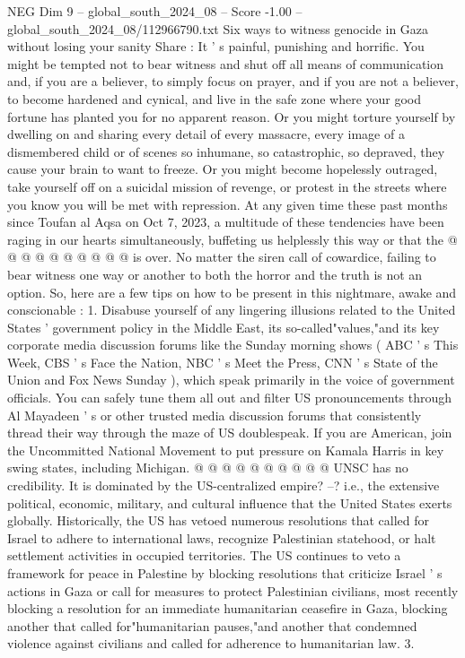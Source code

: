 \begin{textsample}{NEG Dim 9 – global\_south\_2024\_08 – Score -1.00 – global\_south\_2024\_08/112966790.txt}  \label{ex:f9_neg_341}
Six ways to witness genocide in Gaza without losing your sanity Share : It ' s painful, punishing and horrific.
You might be tempted not to bear witness and shut off all means of communication and, if you are a believer, to simply focus on prayer, and if you are not a believer, to become hardened and cynical, and live in the safe zone where your good fortune has planted you for no apparent reason.
Or you might torture yourself by dwelling on and sharing every detail of every massacre, every image of a dismembered child or of scenes so inhumane, so catastrophic, so depraved, they cause your brain to want to freeze.
Or you might become hopelessly outraged, take yourself off on a suicidal mission of revenge, or protest in the streets where you know you will be met with repression.
At any given time these past months since Toufan al Aqsa on Oct 7, 2023, a multitude of these tendencies have been raging in our hearts simultaneously, buffeting us helplessly this way or that the @ @ @ @ @ @ @ @ @ @ is over.
No matter the siren call of cowardice, failing to bear witness one way or another to both the horror and the truth is not an option.
So, here are a few tips on how to be present in this nightmare, awake and conscionable : 1.
Disabuse yourself of any lingering illusions related to the United States ' government policy in the Middle East, its so-called"values,"and its key corporate media discussion forums like the Sunday morning shows ( ABC ' s This Week, CBS ' s Face the Nation, NBC ' s Meet the Press, CNN ' s State of the Union and Fox News Sunday ), which speak primarily in the voice of government officials.
You can safely tune them all out and filter US pronouncements through Al Mayadeen ' s or other trusted media discussion forums that consistently thread their way through the maze of US doublespeak.
If you are American, join the Uncommitted National Movement to put pressure on Kamala Harris in key swing states, including Michigan. @ @ @ @ @ @ @ @ @ @ UNSC has no credibility.
It is dominated by the US-centralized empire? --? i.e., the extensive political, economic, military, and cultural influence that the United States exerts globally.
Historically, the US has vetoed numerous resolutions that called for Israel to adhere to international laws, recognize Palestinian statehood, or halt settlement activities in occupied territories.
The US continues to veto a framework for peace in Palestine by blocking resolutions that criticize Israel ' s actions in Gaza or call for measures to protect Palestinian civilians, most recently blocking a resolution for an immediate humanitarian ceasefire in Gaza, blocking another that called for"humanitarian pauses,"and another that condemned violence against civilians and called for adherence to humanitarian law. 3.

\end{textsample}
